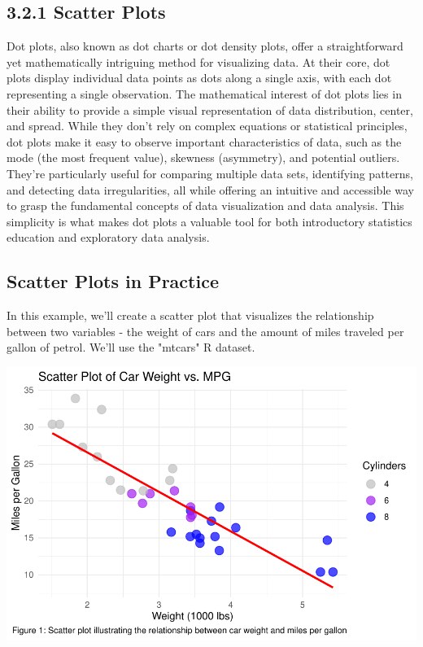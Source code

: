 \documentclass{article}\usepackage[]{graphicx}\usepackage[]{xcolor}
\makeatletter
\def\maxwidth{ %
  \ifdim\Gin@nat@width>\linewidth
    \linewidth
  \else
    \Gin@nat@width
  \fi
}
\newenvironment{kframe}{%
 \def\at@end@of@kframe{}%
 \ifinner\ifhmode%
  \def\at@end@of@kframe{\end{minipage}}%
  \begin{minipage}{\columnwidth}%
 \fi\fi%
 \def\FrameCommand##1{\hskip\@totalleftmargin \hskip-\fboxsep
 \colorbox{shadecolor}{##1}\hskip-\fboxsep
     \hskip-\linewidth \hskip-\@totalleftmargin \hskip\columnwidth}%
 \MakeFramed {\advance\hsize-\width
   \@totalleftmargin\z@ \linewidth\hsize
   \@setminipage}}%
 {\par\unskip\endMakeFramed%
 \at@end@of@kframe}
\newenvironment{knitrout}{}{} %
\makeatother
\begin{document}
\subsection{3.2.1 Scatter Plots}
Dot plots, also known as dot charts or dot density plots, offer a straightforward yet mathematically intriguing method for visualizing data. At their core, dot plots display individual data points as dots along a single axis, with each dot representing a single observation. The mathematical interest of dot plots lies in their ability to provide a simple visual representation of data distribution, center, and spread. While they don't rely on complex equations or statistical principles, dot plots make it easy to observe important characteristics of data, such as the mode (the most frequent value), skewness (asymmetry), and potential outliers. They're particularly useful for comparing multiple data sets, identifying patterns, and detecting data irregularities, all while offering an intuitive and accessible way to grasp the fundamental concepts of data visualization and data analysis. This simplicity is what makes dot plots a valuable tool for both introductory statistics education and exploratory data analysis.

\subsection{Scatter Plots in Practice}
In this example, we'll create a scatter plot that visualizes the relationship between two variables - the weight of cars and the amount of miles traveled per gallon of petrol. We'll use the "mtcars" R dataset.

\begin{knitrout}
\color{fgcolor}\begin{kframe}


{\ttfamily\noindent\itshape{}}\end{kframe}
\includegraphics[width=\maxwidth]{figure/scatter-plot-chunk-1} 
\end{knitrout}
\end{document}
